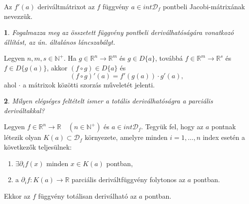 \documentclass[a4paper]{article}
\def\R{\mathbb{R}}
\def\N{\mathbb{N}}
\theoremstyle{qstyle}
\newtheorem{question}{}{}
\begin{document}
	Az $f'(a)$ deriváltmátrixot az $f$ függvény $a \in int \mathcal{D}_{f}$ pontbeli Jacobi-mátrixának nevezzük.
	
	\begin{question}
		Fogalmazza meg az összetett függvény pontbeli deriválhatóságára vonatkozó állítást, az ún. általános láncszabályt.
	\end{question}
	Legyen $n,m,s \in \N^+$. Ha $g\in \R^n \to \R^m$ és $g\in D\{a\}$, továbbá $f \in \R^m \to \R^s$ és $f \in D\{g(a)\}$, akkor $(f \circ g) \in D\{a\}$ és
	$$(f \circ g)'(a) = f'(g(a)) \cdot g'(a) \text{,}$$
	ahol $\cdot$ a mátrixok közötti szorzás műveletét jelenti.
	
	\begin{question}
		Milyen elégséges feltételt ismer a totális deriválhatóságra a parciális deriváltakkal?
	\end{question}
	Legyen $f \in \R^n \to \R \quad (n \in \N^+)$ és $a \in int \mathcal{D}_f$. Tegyük fel, hogy az $a$ pontnak létezik olyan $K(a) \subset \mathcal{D}_f$ környezete, amelyre minden $i = 1,\dots,n$ index esetén a következők teljesülnek:
	\vspace{-4mm}
	\begin{enumerate}
		\item $\exists \partial_i f(x)$ minden $x \in K(a)$ pontban,
		\item a $\partial_i f: K(a)\to \R$ parciális deriváltfüggvény folytonos az $a$ pontban.
	\end{enumerate}
	\vspace{-4mm}
	Ekkor az $f$ függvény totálisan deriválható az $a$ pontban.
\end{document}
